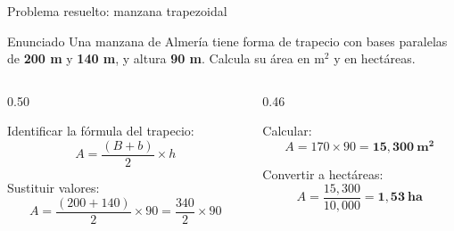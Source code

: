 \documentclass[aspectratio=169, 10pt, spanish]{beamer}
\begin{document}
\begin{frame}{Problema resuelto: manzana trapezoidal}
  \begin{definicionbox}{Enunciado}
    \AlmFontSmall Una manzana de Almería tiene forma de trapecio con
    bases paralelas de \textbf{200 m} y \textbf{140 m},
    y altura \textbf{90 m}.
    Calcula su área en m$^2$ y en hectáreas.
  \end{definicionbox}

  \vspace{0.15cm}
  \begin{columns}[t]
    \begin{column}{0.50\textwidth}
      \begin{pasobox}[1]
        \AlmFontSmall Identificar la fórmula del trapecio:
        \[A = \frac{(B + b)}{2} \times h\]
      \end{pasobox}
      \vspace{0.2cm}
      \begin{pasobox}[2]
        \AlmFontSmall Sustituir valores:
        \[A = \frac{(200 + 140)}{2} \times 90
          = \frac{340}{2} \times 90\]
      \end{pasobox}
    \end{column}
    \begin{column}{0.46\textwidth}
      \begin{pasobox}[3]
        \AlmFontSmall Calcular:
        \[A = 170 \times 90 = \mathbf{15{,}300\ m^2}\]
      \end{pasobox}
      \vspace{0.2cm}
      \begin{pasobox}[4]
        \AlmFontSmall Convertir a hectáreas:
        \[A = \frac{15{,}300}{10{,}000} = \mathbf{1{,}53\ ha}\]
      \end{pasobox}
    \end{column}
  \end{columns}
\end{frame}

\end{document}
